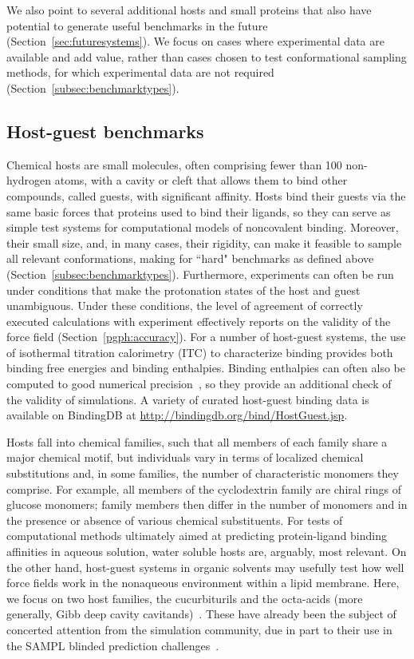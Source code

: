 \documentclass[aps,pre,twocolumn,nofootinbib,superscriptaddress,10pt, final,tightenlines]{revtex4-1}
\begin{document}
We also point to several additional hosts and small proteins that also have potential to generate useful benchmarks in the future (Section~\ref{sec:futuresystems}). 
We focus on cases where experimental data are available and add value, rather than cases chosen to test conformational sampling methods, for which experimental data are not required (Section~\ref{subsec:benchmarktypes}). 

\subsection{Host-guest benchmarks}
\label{sec:hgbenchmarks}
Chemical hosts are small molecules, often comprising fewer than 100 non-hydrogen atoms, with a cavity or cleft that allows them to bind other compounds, called guests, with significant affinity.  
Hosts bind their guests via the same basic forces that proteins used to bind their ligands, so they can serve as simple test systems for computational models of noncovalent binding. 
Moreover, their small size, and, in many cases, their rigidity, can make it feasible to sample all relevant conformations, making for ``hard" benchmarks as defined above (Section~\ref{subsec:benchmarktypes}).  
Furthermore, experiments can often be run under conditions that make the protonation states of the host and guest unambiguous. 
Under these conditions, the level of agreement of correctly executed calculations with experiment effectively reports on the validity of the force field (Section~\ref{pgph:accuracy}). 
For a number of host-guest systems, the use of isothermal titration calorimetry (ITC) to characterize binding provides both binding free energies and binding enthalpies. 
Binding enthalpies can often also be computed to good numerical precision~\cite{henriksen_computational_2015}, so they provide an additional check of the validity of simulations.
A variety of curated host-guest binding data is available on BindingDB at \url{http://bindingdb.org/bind/HostGuest.jsp}.

Hosts fall into chemical families, such that all members of each family share a major chemical motif, but individuals vary in terms of localized chemical substitutions and, in some families, the number of characteristic monomers they comprise.  
For example, all members of the cyclodextrin family are chiral rings of glucose monomers; family members then differ in the number of monomers and in the presence or absence of various chemical substituents. 
For tests of computational methods ultimately aimed at predicting protein-ligand binding affinities in aqueous solution, water soluble hosts are, arguably, most relevant. 
On the other hand, host-guest systems in organic solvents may usefully test how well force fields work in the nonaqueous environment within a lipid membrane. 
Here, we focus on two host families, the cucurbiturils \cite{freeman_cucurbituril_1981,mock_host-guest_1983} and the octa-acids (more generally, Gibb deep cavity cavitands)~\cite{gibb_well-defined_2004, hillyer_synthesis_2016}. 
These have already been the subject of concerted attention from the simulation community, due in part to their use in the SAMPL blinded prediction challenges~\cite{muddana_sampl3_2012, muddana_sampl4_2014, yin_overview_2016}.  
\end{document}
